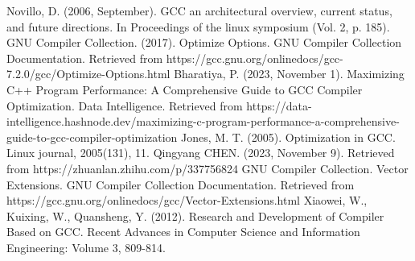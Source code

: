 \documentclass[conference]{IEEEtran}
\begin{document}
\begin{thebibliography}{00}

	 Novillo, D. (2006, September). GCC an architectural overview, current status, and future directions. In Proceedings of the linux symposium (Vol. 2, p. 185).
	 GNU Compiler Collection. (2017). Optimize Options. GNU Compiler Collection Documentation. Retrieved from https://gcc.gnu.org/onlinedocs/gcc-7.2.0/gcc/Optimize-Options.html
	 Bharatiya, P. (2023, November 1). Maximizing C++ Program Performance: A Comprehensive Guide to GCC Compiler Optimization. Data Intelligence. Retrieved from https://data-intelligence.hashnode.dev/maximizing-c-program-performance-a-comprehensive-guide-to-gcc-compiler-optimization
	 Jones, M. T. (2005). Optimization in GCC. Linux journal, 2005(131), 11.
	 Qingyang CHEN. (2023, November 9). Retrieved from https://zhuanlan.zhihu.com/p/337756824
	 GNU Compiler Collection. Vector Extensions. GNU Compiler Collection Documentation. Retrieved from https://gcc.gnu.org/onlinedocs/gcc/Vector-Extensions.html
	 Xiaowei, W., Kuixing, W., Quansheng, Y. (2012). Research and Development of Compiler Based on GCC. Recent Advances in Computer Science and Information Engineering: Volume 3, 809-814.

\end{thebibliography}


\vspace{12pt}
\end{document}
